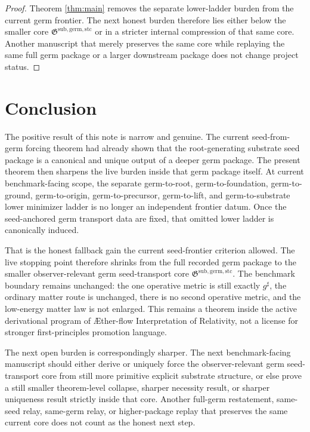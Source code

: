 \documentclass[11pt]{article}
\newcommand{\Aflow}{\AE{}ther-flow}
\newcommand{\TheoryName}{\Aflow{} Interpretation of Relativity}
\newcommand{\CompletedMetric}{g^{\sharp}}
\newcommand{\GermTransportCore}{\mathfrak G^{\mathrm{sub,germ,stc}}}
\begin{document}
\begin{proof}
Theorem \ref{thm:main} removes the separate lower-ladder burden from the current germ frontier. The next honest burden therefore lies either below the smaller core \(\GermTransportCore\) or in a stricter internal compression of that same core. Another manuscript that merely preserves the same core while replaying the same full germ package or a larger downstream package does not change project status.
\end{proof}

\section{Conclusion}

The positive result of this note is narrow and genuine. The current seed-from-germ forcing theorem had already shown that the root-generating substrate seed package is a canonical and unique output of a deeper germ package. The present theorem then sharpens the live burden inside that germ package itself. At current benchmark-facing scope, the separate germ-to-root, germ-to-foundation, germ-to-ground, germ-to-origin, germ-to-precursor, germ-to-lift, and germ-to-substrate lower minimizer ladder is no longer an independent frontier datum. Once the seed-anchored germ transport data are fixed, that omitted lower ladder is canonically induced.

That is the honest fallback gain the current seed-frontier criterion allowed. The live stopping point therefore shrinks from the full recorded germ package to the smaller observer-relevant germ seed-transport core \(\GermTransportCore\). The benchmark boundary remains unchanged: the one operative metric is still exactly \(\CompletedMetric\), the ordinary matter route is unchanged, there is no second operative metric, and the low-energy matter law is not enlarged. This remains a theorem inside the active derivational program of \TheoryName{}, not a license for stronger first-principles promotion language.

The next open burden is correspondingly sharper. The next benchmark-facing manuscript should either derive or uniquely force the observer-relevant germ seed-transport core from still more primitive explicit substrate structure, or else prove a still smaller theorem-level collapse, sharper necessity result, or sharper uniqueness result strictly inside that core. Another full-germ restatement, same-seed relay, same-germ relay, or higher-package replay that preserves the same current core does not count as the honest next step.
\end{document}

